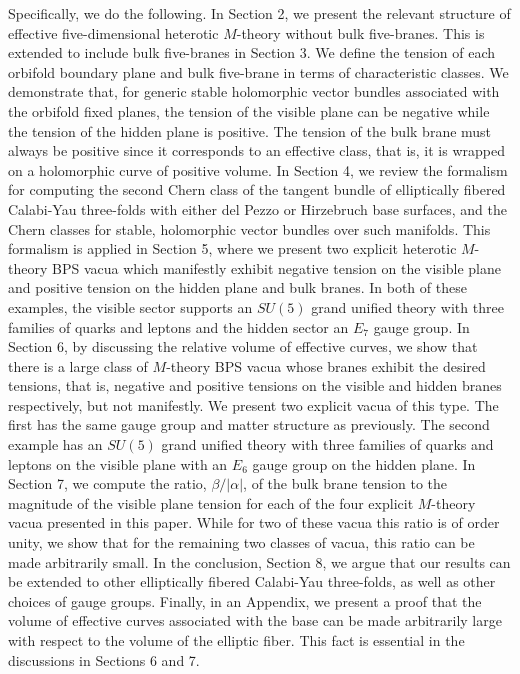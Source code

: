 \documentclass[a4paper,12pt]{article}
\numberwithin{equation}{section}
\theoremstyle{plain}
\begin{document}
Specifically, we do the following. In Section 2, we present the relevant
structure of effective five-dimensional heterotic $M$-theory without bulk
five-branes. This is extended to include bulk five-branes in Section 3. We
define the tension of each orbifold boundary plane and bulk
five-brane in terms of characteristic classes. We demonstrate that, for
generic stable holomorphic vector bundles associated 
with the orbifold fixed planes,
the tension of the visible plane can be negative while the tension of the
hidden plane is positive. The tension of the bulk brane must always be
positive since it corresponds to an effective class, that is, it is wrapped on
a holomorphic curve of positive volume. In Section 4, we review
the formalism for computing the second Chern class of the tangent
bundle of elliptically fibered Calabi-Yau three-folds with either 
del Pezzo or Hirzebruch base surfaces, and the Chern classes for stable,
holomorphic vector bundles over such manifolds. This formalism is applied in
Section 5, where we present two explicit heterotic $M$-theory BPS vacua
which manifestly exhibit negative tension on the visible plane and 
positive tension on the hidden plane  and bulk branes. In both of these examples,
the visible sector supports an $SU(5)$ grand unified theory with three families
of quarks and leptons and the hidden sector an $E_{7}$ gauge group. In
Section 6, by discussing the relative volume of effective curves, we show that
there is a large class of $M$-theory BPS vacua whose branes exhibit the desired 
tensions, that is, negative and positive tensions on the visible and
hidden branes respectively, but not manifestly.
We present two explicit vacua of this type. The first has the same gauge
group and matter structure as previously. The second example has
an $SU(5)$ grand unified theory with three families of quarks and leptons 
on the visible plane with an $E_{6}$ gauge group on the hidden plane. In Section 7, 
we compute the ratio, $\beta/|\alpha|$, of the bulk
brane tension to the magnitude of the visible plane tension for each of the
four explicit $M$-theory vacua presented in this paper. While for two of 
these vacua this ratio is of order unity, we show that for the remaining two 
classes of vacua, this ratio can be made arbitrarily small.
In the conclusion, Section 8, we argue that our results can be extended to 
other elliptically fibered
Calabi-Yau three-folds, as well as other choices of gauge groups.
Finally, in an Appendix, we present a proof that the
volume of effective curves associated with the base can be made arbitrarily
large with respect to the volume of the elliptic fiber. This fact is essential
in the discussions in Sections 6 and 7. 
\end{document}
